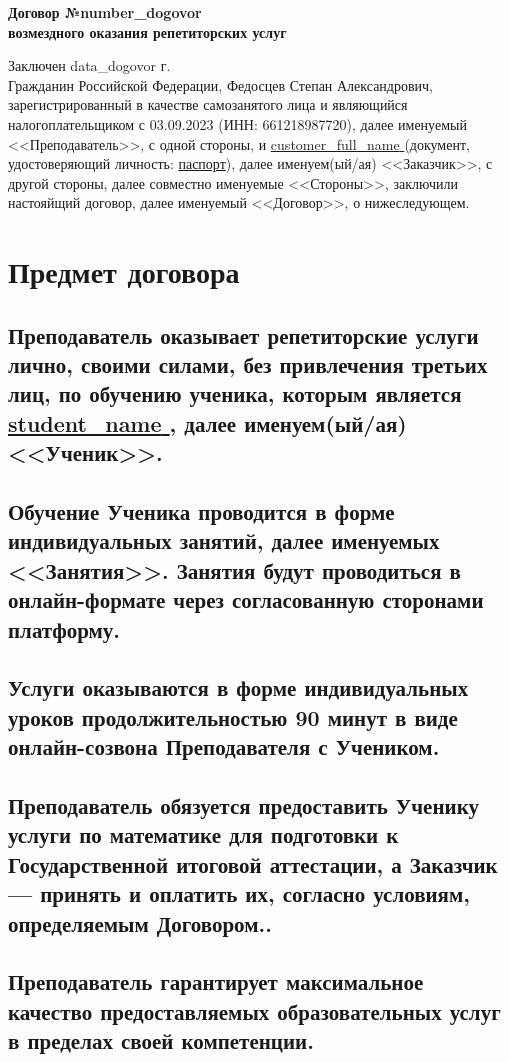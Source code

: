 \documentclass[a4paper,12pt]{article}
\begin{document}
\begin{center}
    \Large{\textbf{Договор №{{number_dogovor}} }} \\
    \large{\textbf{возмездного оказания репетиторских услуг}}
\end{center}
Заключен \hfill {{data_dogovor}} г.\\[1cm]
\noindent
Гражданин Российской Федерации, Федосцев Степан Александрович, зарегистрированный в качестве самозанятого лица и являющийся налогоплательщиком с 03.09.2023 (ИНН: 661218987720), далее именуемый <<Преподаватель>>, с одной стороны,
и \underline{ {{customer_full_name}} } (документ, удостоверяющий личность: \underline{паспорт}), \textbf{}далее именуем(ый/ая) <<Заказчик>>, с другой стороны, далее совместно именуемые <<Стороны>>, заключили настояйщий договор, далее именуемый <<Договор>>, о нижеследующем.

\Large{\section{Предмет договора}}
\subsection{Преподаватель оказывает репетиторские услуги лично, своими силами, без привлечения третьих лиц, по обучению ученика, которым является \underline{ {{student_name}} }, далее именуем(ый/ая) <<Ученик>>.}
\subsection{Обучение Ученика проводится в форме индивидуальных занятий, далее именуемых <<Занятия>>. Занятия будут проводиться в онлайн-формате через согласованную сторонами платформу.}
\subsection{Услуги оказываются в форме индивидуальных уроков продолжительностью 90 минут в виде онлайн-созвона Преподавателя с Учеником.}
\subsection{Преподаватель обязуется предоставить Ученику услуги по математике для подготовки к Государственной итоговой аттестации, а Заказчик — принять и оплатить их, согласно условиям, определяемым Договором..}
\subsection{Преподаватель гарантирует максимальное качество предоставляемых образовательных услуг в пределах своей компетенции.}
\end{document}
